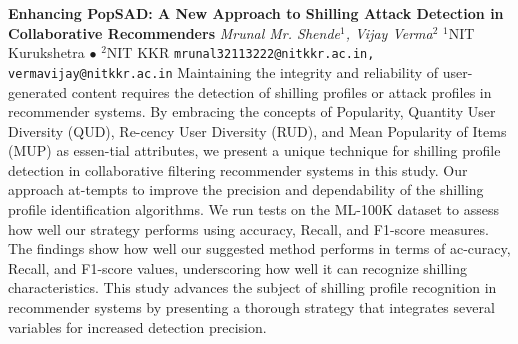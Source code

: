 
    \begin{conf-abstract}[]
        {\textbf{Enhancing PopSAD: A New Approach to Shilling Attack Detection in Collaborative Recommenders}}
        {\textit{Mrunal Mr. Shende$^{1}$, Vijay Verma$^{2}$}}
        {$^{1}$NIT Kurukshetra $\bullet$ $^{2}$NIT KKR}
        {\texttt{mrunal32113222@nitkkr.ac.in, vermavijay@nitkkr.ac.in}}
        {Maintaining the integrity and reliability of user-generated content requires the detection of shilling profiles or attack profiles in recommender systems. By embracing the concepts of Popularity, Quantity User Diversity (QUD), Re-cency User Diversity (RUD), and Mean Popularity of Items (MUP) as essen-tial attributes, we present a unique technique for shilling profile detection in collaborative filtering recommender systems in this study. Our approach at-tempts to improve the precision and dependability of the shilling profile identification algorithms. We run tests on the ML-100K dataset to assess how well our strategy performs using accuracy, Recall, and F1-score measures. The findings show how well our suggested method performs in terms of ac-curacy, Recall, and F1-score values, underscoring how well it can recognize shilling characteristics. This study advances the subject of shilling profile recognition in recommender systems by presenting a thorough strategy that integrates several variables for increased detection precision.}
    \end{conf-abstract}
        